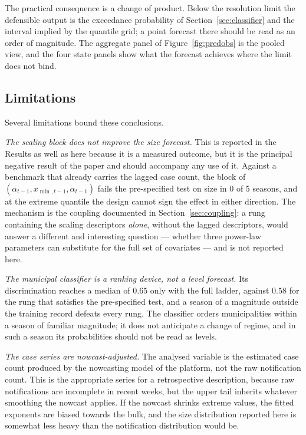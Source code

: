 \documentclass[english,10pt,b5paper]{article}
\begin{document}
The practical consequence is a change of product. Below the resolution limit the
defensible output is the exceedance probability of Section~\ref{sec:classifier}
and the interval implied by the quantile grid; a point forecast there should be
read as an order of magnitude. The
aggregate panel of Figure~\ref{fig:predobs} is the pooled view, and the four
state panels show what the forecast achieves where the limit does not bind.

\subsection{Limitations}
\label{sec:limitations}

Several limitations bound these conclusions.

\emph{The scaling block does not improve the size forecast.} This is reported in the
Results as well as here because it is a measured outcome, but it is the
principal negative result of the paper and should accompany any use of it. Against
a benchmark that already carries the lagged case count, the block of
$(\alpha_{t-1}, x_{\min,t-1}, \dot\alpha_{t-1})$ fails the pre-specified test on
size in 0 of 5 seasons, and at the extreme quantile the design cannot sign the
effect in either direction. The mechanism is the coupling documented in
Section~\ref{sec:coupling}: a rung containing the scaling descriptors
\emph{alone}, without the lagged descriptors, would answer a different and
interesting question --- whether three power-law parameters can substitute for the
full set of covariates --- and is not reported here.

\emph{The municipal classifier is a ranking device, not a level forecast.} Its
discrimination reaches a median of $0.65$ only with the full ladder, against $0.58$
for the rung that satisfies the pre-specified test, and a season of a magnitude
outside the training record defeats every rung. The classifier orders
municipalities within a season of familiar magnitude; it does not anticipate a
change of regime, and in such a season its probabilities should not be read as
levels.

\emph{The case series are nowcast-adjusted.} The analysed variable is the estimated
case count produced by the nowcasting model of the platform, not the raw notification
count. This is the appropriate series for a retrospective description, because raw
notifications are incomplete in recent weeks, but the upper tail inherits whatever
smoothing the nowcast applies. If the nowcast shrinks extreme values, the fitted
exponents are biased towards the bulk, and the size distribution reported here is
somewhat less heavy than the notification distribution would be.
\end{document}
